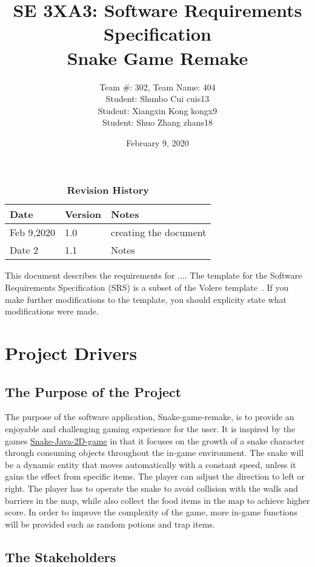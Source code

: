 \documentclass[12pt, titlepage]{article}
\title{SE 3XA3: Software Requirements Specification\\\textbf{Snake Game Remake}}
\author{Team \#: 302, Team Name: 404
		\\ Student: Shunbo Cui	cuis13
		\\ Student: Xiangxin Kong	kongx9
		\\ Student: Shuo Zhang	zhans18
}
\date{February 9, 2020}
\begin{document}
\maketitle
{}
\tableofcontents
\listoftables
\listoffigures

\begin{table}[bp]
\caption{\bf Revision History}
\begin{tabularx}{\textwidth}{p{3cm}p{2cm}X}
\toprule {\bf Date} & {\bf Version} & {\bf Notes}\\
\midrule
Feb 9,2020 & 1.0 & creating the document\\
Date 2 & 1.1 & Notes\\
\bottomrule
\end{tabularx}
\end{table}

\newpage


This document describes the requirements for ....  The template for the Software
Requirements Specification (SRS) is a subset of the Volere
template~\citep{RobertsonAndRobertson2012}.  If you make further modifications
to the template, you should explicity state what modifications were made.

\section{Project Drivers}

\subsection{The Purpose of the Project}
The purpose of the software application, Snake-game-remake, is to provide an enjoyable and challenging gaming experience for the user. It is inspired by the games \href{https://github.com/mtala3t/Snake-Java-2D-Game}{Snake-Java-2D-game} in that it focuses on the growth of a snake character through consuming objects throughout the in-game environment. The snake will be a dynamic entity that moves automatically with a constant speed, unless it gains the effect from specific items. The player can adjust the direction to left or right. The player has to operate the snake to avoid collision with the walls and barriers in the map, while also collect the food items in the map to achieve higher score. In order to improve the complexity of the game, more in-game functions will be provided such as random potions and trap items.
\subsection{The Stakeholders}
\end{document}
